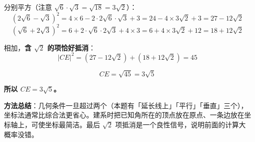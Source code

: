 \begin{answer}
分别平方（注意 $\sqrt6\cdot\sqrt3=\sqrt{18}=3\sqrt2$）：
\nopagebreak[4]
\[\left(2\sqrt6-\sqrt3\right)^2=4\times6-2\cdot2\sqrt6\cdot\sqrt3+3=24-4\times3\sqrt2+3=27-12\sqrt2\]
\nopagebreak[4]
\[\left(\sqrt6+2\sqrt3\right)^2=6+2\cdot\sqrt6\cdot2\sqrt3+4\times3=6+4\times3\sqrt2+12=18+12\sqrt2\]

相加，\textbf{含 $\sqrt2$ 的项恰好抵消}：
\nopagebreak[4]
\[|CE|^2=\left(27-12\sqrt2\right)+\left(18+12\sqrt2\right)=45\]

\nopagebreak[4]
\[CE=\sqrt{45}=3\sqrt5\]

\textbf{所以 $CE=3\sqrt5$。}

\begin{gktip}
\textbf{方法总结}：几何条件一旦超过两个（本题有「延长线上」「平行」「垂直」三个），坐标法通常比综合法更省心。建系时把已知角所在的顶点放在原点、一条边放在坐标轴上，可使坐标最简洁。最后 $\sqrt2$ 项抵消是一个良性信号，说明前面的计算大概率没错。
\end{gktip}



\par\medskip

\end{answer}
